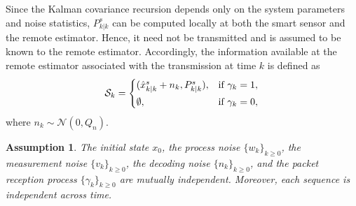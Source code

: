 \documentclass[letterpaper, 10 pt, conference]{ieeeconf}
\newtheorem{assumption}[theorem]{Assumption}
\begin{document}
Since the Kalman covariance recursion depends only on the system parameters and noise statistics, $P^s_{k|k}$ can be computed locally at both the smart sensor and the remote estimator. Hence, it need not be transmitted and is assumed to be known to the remote estimator. Accordingly, the information available at the remote estimator associated with the transmission at time 
$k$ is defined as
\begin{equation*}
    {\cal S}_k =
\begin{cases}
(\hat{x}^s_{k|k}+n_{k}, P^s_{k|k}), & \text{if $\gamma_k=1$},\\[3pt]
\emptyset, & \text{if $\gamma_k=0$},
\end{cases}
\end{equation*}
where $n_k\sim \mathcal{N}(0,Q_n)$.

\begin{assumption}\label{main.ass}
The initial state $x_0$, the process noise $\{w_k\}_{k\geq 0}$, the measurement noise $\{v_k\}_{k\geq 0}$, the decoding noise $\{n_k\}_{k\geq 0}$, and the packet reception process $\{\gamma_k\}_{k\geq 0}$ are mutually independent. Moreover, each  sequence  is independent across time.
\end{assumption}
\end{document}
